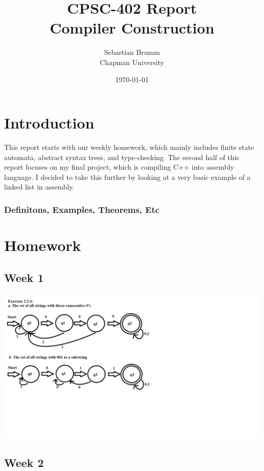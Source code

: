 \documentclass{article}
\title{CPSC-402 Report\\Compiler Construction}
\author{Sebastian Brumm  \\ Chapman University}
\date{\today}
\theoremstyle{theorem}
\theoremstyle{definition}
\theoremstyle{remark}
\begin{document}
\maketitle

\begin{abstract}
\end{abstract}

\tableofcontents

\section{Introduction}\label{intro}

This report starts with our weekly homework, which mainly includes finite state automata, abstract syntax trees, and type-checking. The second half of this report focuses on my final project, which is compiling C++ into assembly language. I decided to take this further by looking at a very basic example of a linked list in assembly.

\subsubsection{Definitons, Examples, Theorems, Etc}

\section{Homework}\label{homework}

\subsection{Week 1}

\includegraphics[scale=0.4]{Images/Homework1.png}

\subsection{Week 2}
\end{document}
